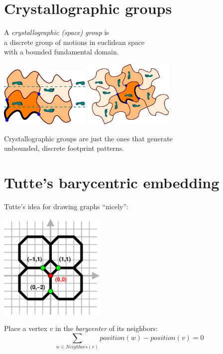 \documentclass{beamer}
\begin{document}
\section{Crystallographic groups}

\begin{frame}
  \begin{center}
    A {\em crystallographic (space) group\/} is\\
    a discrete group of motions in euclidean space\\
    with a bounded fundamental domain.

    \includegraphics[width=1.7in]{heesch-TGTG}
    \qquad
    \includegraphics[width=1.7in]{heesch-C4C4C4C4C}

    Crystallographic groups are just the ones that generate\\
    unbounded, discrete footprint patterns.
  \end{center}
\end{frame}


\section{Tutte's barycentric embedding}

\begin{frame}
  \begin{center}
    Tutte's idea for drawing graphs ``nicely'':

    \includegraphics[width=2in]{equilibrium1}

    Place a vertex $v$ in the {\em barycenter} of its neighbors:
    \[
    \sum_{w\in Neighbors(v)} position(w)-position(v) = 0
    \]
  \end{center}
\end{frame}
\end{document}
